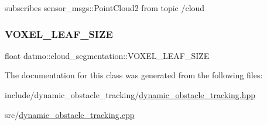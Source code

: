 subscribes sensor\+\_\+msgs\+::\+Point\+Cloud2 from topic /cloud 

\mbox{\label{classdatmo_1_1cloud__segmentation_af6f1f8553f2a18176ae84b78ddea07c9}} 
\subsubsection{\texorpdfstring{V\+O\+X\+E\+L\+\_\+\+L\+E\+A\+F\+\_\+\+S\+I\+ZE}{VOXEL\_LEAF\_SIZE}}
{\footnotesize\ttfamily float datmo\+::cloud\+\_\+segmentation\+::\+V\+O\+X\+E\+L\+\_\+\+L\+E\+A\+F\+\_\+\+S\+I\+ZE\hspace{0.3cm}{\ttfamily [protected]}}



The documentation for this class was generated from the following files\+:\begin{DoxyCompactItemize}
\item 
include/dynamic\+\_\+obstacle\+\_\+tracking/\hyperlink{dynamic__obstacle__tracking_8hpp}{dynamic\+\_\+obstacle\+\_\+tracking.\+hpp}\item 
src/\hyperlink{dynamic__obstacle__tracking_8cpp}{dynamic\+\_\+obstacle\+\_\+tracking.\+cpp}\end{DoxyCompactItemize}
